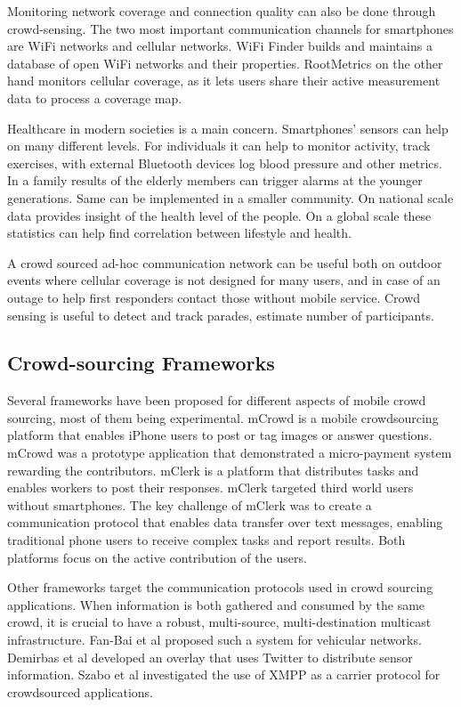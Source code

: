 \documentclass[conference,letterpaper]{IEEEtran}
\begin{document}
Monitoring network coverage and connection quality can also be done through crowd-sensing. The two most important communication channels for smartphones are WiFi networks and cellular networks. WiFi Finder builds and maintains a database of open WiFi networks and their properties. RootMetrics on the other hand monitors cellular coverage, as it lets users share their active measurement data to process a coverage map.

Healthcare in modern societies is a main concern. Smartphones' sensors can help on many different levels. For individuals it can help to monitor activity, track exercises, with external Bluetooth devices log blood pressure and other metrics. In a family results of the elderly members can trigger alarms at the younger generations. Same can be implemented in a smaller community. On national scale data provides insight of the health level of the people. On a global scale these statistics can help find correlation between lifestyle and health.

A crowd sourced ad-hoc communication network can be useful both on outdoor events where cellular coverage is not designed for many users, and in case of an outage to help first responders contact those without mobile service. Crowd sensing is useful to detect and track parades, estimate number of participants.

\subsection{Crowd-sourcing Frameworks}
Several frameworks have been proposed for different aspects of mobile crowd sourcing, most of them being experimental. mCrowd is a mobile crowdsourcing platform that enables iPhone users to post or tag images or answer questions. mCrowd was a prototype application that demonstrated a micro-payment system rewarding the contributors.
mClerk is a platform that distributes tasks and enables workers to post their responses. mClerk targeted third world users without smartphones. The key challenge of mClerk was to create a communication protocol that enables data transfer over text messages, enabling traditional phone users to receive complex tasks and report results. Both platforms focus on the active contribution of the users.

Other frameworks target the communication protocols used in crowd sourcing applications. When information is both gathered and consumed by the same crowd, it is crucial to have a robust, multi-source, multi-destination multicast infrastructure. Fan-Bai et al proposed such a system for vehicular networks. Demirbas et al developed an overlay that uses Twitter to distribute sensor information. Szabo et al investigated the use of XMPP as a carrier protocol for crowdsourced applications.
\end{document}
